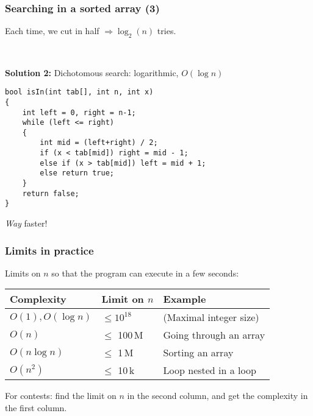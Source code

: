 \documentclass[12pt]{beamer}
\begin{document}
\begin{frame}[fragile]
\frametitle{Searching in a sorted array (3)}
Each time, we cut in half $\Rightarrow \log_2(n)$ tries.

~

\textbf{Solution 2:} Dichotomous search: logarithmic, $O(\log n)$
\begin{lstlisting}
bool isIn(int tab[], int n, int x)
{
    int left = 0, right = n-1;
    while (left <= right)
    {
        int mid = (left+right) / 2;
        if (x < tab[mid]) right = mid - 1;
        else if (x > tab[mid]) left = mid + 1;
        else return true;
    }
    return false;
}
\end{lstlisting}
\emph{Way} faster!
\end{frame}

\begin{frame}
\frametitle{Limits in practice}
Limits on $n$ so that the program can execute in a few seconds:
\begin{center}
\begin{tabu}{lll}
    \toprule
    Complexity & Limit on $n$ & Example \\
    \midrule
    $O(1), O(\log n)$ & $\leq 10^{18}$ & (Maximal integer size) \\
    $O(n)$ & $\leq$ 100\,M & Going through an array \\
    $O(n\log n)$ & $\leq$ 1\,M & Sorting an array \\
    $O(n^2)$ & $\leq$ 10\,k & Loop nested in a loop \\
    \bottomrule
\end{tabu}
\end{center}
For contests: find the limit on $n$ in the second column, and get the complexity in the first column.
\end{frame}
\end{document}
